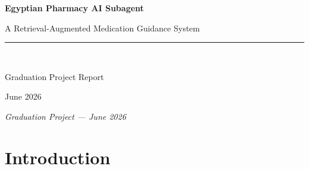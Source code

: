 \documentclass[12pt,a4paper]{article}
\begin{document}
\begin{titlepage}
    \centering
    \vspace*{2cm}
    {\LARGE\bfseries Egyptian Pharmacy AI Subagent\par}
    \vspace{0.5cm}
    {\large A Retrieval-Augmented Medication Guidance System\par}
    \vspace{1.5cm}
    \rule{0.6\textwidth}{0.4pt}\\[1em]
    {\large Graduation Project Report\par}
    \vspace{0.5cm}
    {\normalsize June 2026\par}
    \vspace{2cm}
    \begin{abstract}
        \noindent
        This report presents the design, methodology, and evaluation of a
        pharmacy-focused AI subagent built for the Egyptian drug market.
        The system addresses a concrete gap in digital healthcare: patients
        seeking medication guidance are frequently exposed to inaccurate
        information, including hallucinated drug names and prices produced
        by general-purpose language models unaware of the Egyptian drug
        registry. The proposed system combines a curated pharmaceutical
        dataset, a three-channel hybrid retrieval pipeline, a clinical
        safety screening layer, and a large language model to deliver
        grounded, hallucination-resistant medication guidance in Egyptian
        Arabic. Designed as a specialised subagent within a broader
        voice-agent healthcare workflow, the system strictly confines
        itself to pharmacy tasks and escalates all out-of-scope requests
        to the primary orchestrator.
    \end{abstract}
    \vfill
    {\small\textit{Graduation Project --- June 2026}}
\end{titlepage}

\tableofcontents
\newpage

\section{Introduction}
\end{document}
